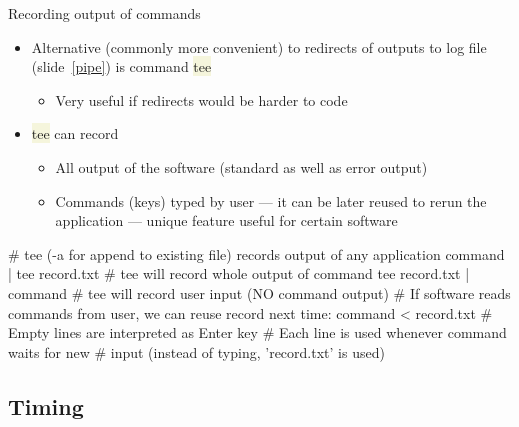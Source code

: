 \documentclass[compress, xelatex, 11pt, xcolor=svgnames, aspectratio=169,
	hyperref={
		bookmarks=true,
		unicode=true,
		colorlinks=true,
		pdftitle={Linux, command line and MetaCentrum},
		plainpages=false,
		pdfauthor={Vojtech Zeisek},
		pdfsubject={Course about use of Linux command line, writing shell scripts and using MetaCentrum of CESNET},
		pdfcreator={XeLaTeX},
		pdfkeywords={Linux, GNU, BASH, shell, command line, MetaCentrum},
		linkcolor=DarkRed, %
		anchorcolor=DarkBlue, %
		citecolor=Indigo, %
		filecolor=NavyBlue, %
		menucolor=DarkMagenta, %
		urlcolor=DarkBlue, %
		},
	url={hyphens, lowtilde} %
	]{beamer}
\renewcommand{\texttt}[1]{\colorbox{Beige}{{\ttfamily #1}}}
\begin{document}
\begin{frame}[fragile]{Recording output of commands}
	\begin{itemize}
		\item Alternative (commonly more convenient) to redirects of outputs to log file (slide~\ref{pipe}) is command \texttt{tee}
		\begin{itemize}
			\item Very useful if redirects would be harder to code
		\end{itemize}
		\item \texttt{tee} can record
		\begin{itemize}
			\item All output of the software (standard as well as error output)
			\item Commands (keys) typed by user --- it can be later reused to rerun the application --- unique feature useful for certain software
		\end{itemize}
	\end{itemize}
	\vfill
	\begin{bashcode}
    # tee (-a for append to existing file) records output of any application
    command | tee record.txt # tee will record whole output of command
    tee record.txt | command # tee will record user input (NO command output)
    # If software reads commands from user, we can reuse record next time:
    command < record.txt # Empty lines are interpreted as Enter key
                         # Each line is used whenever command waits for new
                         # input (instead of typing, 'record.txt' is used)
	\end{bashcode}
\end{frame}

\subsection{Timing}
\end{document}
